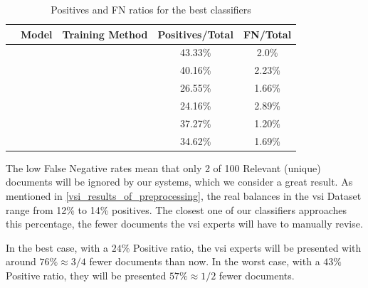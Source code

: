 \begin{table}[ht]
\centering
\begin{tabular}{ccccc}
\hline
  \contentType{}                                   & Model & Training Method & Positives/Total & FN/Total \\ \hline
  \trafilaturaTitle{} & \bertmultilingual{} & \petThousand{}  & 43.33\% & 2.0\%\\ \hline %

 \trafilaturaAbstract{} & \bertxlmroberta{} & \petThousand{} & 40.16\% & 2.23\% \\  \hline %
\trafilaturaFulltext{} & \bertmultilingual{} & \petThousand{} & 26.55\% & 1.66\%\\%
\trafilaturaFulltext{} & \bertxlmroberta{} & \balanced{} & 24.16\% &  2.89\%\\%
\trafilaturaFulltext{} & \bertxlmroberta{} & \petThousand{} & 37.27\% & 1.20\% \\ %
\hline
\translationTitle{} & \bertmultilingual{} & \petThousand{} & 34.62\% & 1.69\% \\ %
\hline
\end{tabular}
\caption{Positives and FN ratios for the best classifiers}
\label{tab:08_ratio_of_positives}
\end{table}

The low False Negative rates mean that only 2 of 100 Relevant (unique) documents will be ignored by our systems, which we consider a great result. 
As mentioned in \headerName{} \ref{vsi_results_of_preprocessing}, the real balances in the \gls{vsi} Dataset range from 12\% to 14\% positives. The closest one of our classifiers approaches this percentage, the fewer documents the \gls{vsi} experts will have to manually revise.

In the best case, with a $24\%$ Positive ratio, the \gls{vsi} experts will be presented with around $76\% \approx 3/4$ fewer documents than now. In the worst case, with a $43\%$ Positive ratio, they will be presented $57\% \approx 1/2$ fewer documents. 



